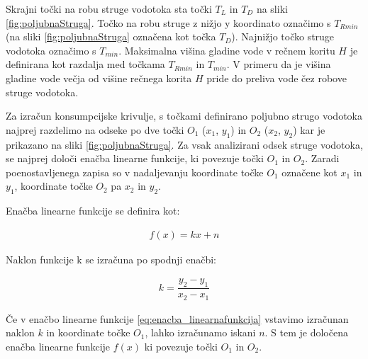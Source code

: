 Skrajni točki na robu struge vodotoka sta točki $T_L$ in $T_D$ na sliki \ref{fig:poljubnaStruga}. Točko na robu struge z nižjo y koordinato označimo s $T_{Rmin}$ (na sliki \ref{fig:poljubnaStruga} označena kot točka $T_D$). Najnižjo točko struge vodotoka označimo s $T_{min}$. Maksimalna višina gladine vode v rečnem koritu $H$ je definirana kot razdalja med točkama $T_{Rmin}$ in $T_{min}$. V primeru da je višina gladine vode večja od višine rečnega korita $H$ pride do preliva vode čez robove struge vodotoka.



Za izračun konsumpcijske krivulje, s točkami definirano poljubno strugo vodotoka najprej razdelimo na odseke po dve točki $O_1$ ($x_1$, $y_1$) in $O_2$ ($x_2$, $y_2$) kar je prikazano na sliki \ref{fig:poljubnaStruga}. Za vsak analizirani odsek struge vodotoka, se najprej določi enačba linearne funkcije, ki povezuje točki $O_1$ in $O_2$.  Zaradi poenostavljenega zapisa so v nadaljevanju koordinate točke $O_1$ označene kot $x_1$ in $y_1$, koordinate točke $O_2$ pa $x_2$ in $y_2$.


Enačba linearne funkcije se definira kot:
\begin{ceqn}
\begin{align}
f(x) = kx + n \label{eq:enacba_linearnafunkcija}
\end{align}
\end{ceqn}

Naklon funkcije k se izračuna po spodnji enačbi:

\begin{ceqn}
\begin{align}
k = \dfrac{y_2 - y_1}{x_2 - x_1}
\end{align}
\end{ceqn}



Če v enačbo linearne funkcije \ref{eq:enacba_linearnafunkcija} vstavimo izračunan naklon $k$ in koordinate točke $O_1$, lahko izračunamo iskani $n$. S tem je določena enačba linearne funkcije $f(x)$ ki povezuje točki $O_1$ in $O_2$.


